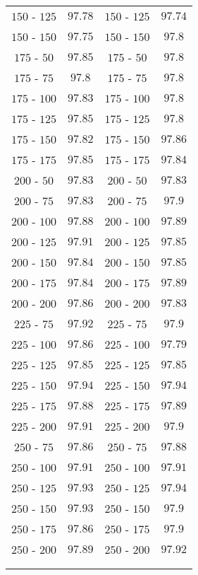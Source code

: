 \begin{center}
\begin{table}[]
\begin{center}
\begin{tabular}{@{}cc|cc@{}}
$150$ - $125$ & $97.78$  & $150$ - $125$ & $97.74$ \\ [1pt]
$150$ - $150$ & $97.75$  &  $150$ - $150$ & $97.8$ \\ [1pt]
$175$ - $50$ & $97.85$ &  $175$ - $50$ & $97.8$ \\ [1pt]
$175$ - $75$ & $97.8$ &  $175$ - $75$ & $97.8$ \\ [1pt]
$175$ - $100$ & $97.83$  &  $175$ - $100$ & $97.8$ \\ [1pt]
$175$ - $125$ & $97.85$  &  $175$ - $125$ & $97.8$ \\ [1pt]
$175$ - $150$ & $97.82$  & $175$ - $150$ & $97.86$ \\ [1pt]
$175$ - $175$ & $97.85$  & $175$ - $175$ & $97.84$ \\ [1pt]
$200$ - $50$ & $97.83$  &  $200$ - $50$ & $97.83$ \\ [1pt]
$200$ - $75$ & $97.83$ &  $200$ - $75$ & $97.9$ \\ [1pt]
$200$ - $100$ & $97.88$  & $200$ - $100$ & $97.89$ \\ [1pt]
$200$ - $125$ & $97.91$  & $200$ - $125$ & $97.85$ \\ [1pt]
$200$ - $150$ & $97.84$  & $200$ - $150$ & $97.85$ \\ [1pt]
$200$ - $175$ & $97.84$  & $200$ - $175$ & $97.89$ \\ [1pt]
$200$ - $200$ & $97.86$  & $200$ - $200$ & $97.83$ \\ [1pt]
$225$ - $75$ & $97.92$ &  $225$ - $75$ & $97.9$ \\ [1pt]
$225$ - $100$ & $97.86$  & $225$ - $100$ & $97.79$ \\ [1pt]
$225$ - $125$ & $97.85$  & $225$ - $125$ & $97.85$ \\ [1pt]
$225$ - $150$ & $97.94$  & $225$ - $150$ & $97.94$ \\ [1pt]
$225$ - $175$ & $97.88$  & $225$ - $175$ & $97.89$ \\ [1pt]
$225$ - $200$ & $97.91$  &  $225$ - $200$ & $97.9$ \\ [1pt]
$250$ - $75$ & $97.86$  &  $250$ - $75$ & $97.88$ \\ [1pt]
$250$ - $100$ & $97.91$  & $250$ - $100$ & $97.91$ \\ [1pt]
$250$ - $125$ & $97.93$  & $250$ - $125$ & $97.94$ \\ [1pt]
$250$ - $150$ & $97.93$  &  $250$ - $150$ & $97.9$ \\ [1pt]
$250$ - $175$ & $97.86$  &  $250$ - $175$ & $97.9$ \\ [1pt]
$250$ - $200$ & $97.89$  & $250$ - $200$ & $97.92$ \\ [1pt]
\hline\\[-11pt]
\hline\\[-8pt]
\end{tabular}\\[5pt]
\end{center}
\normalsize
\end{table}
\end{center}